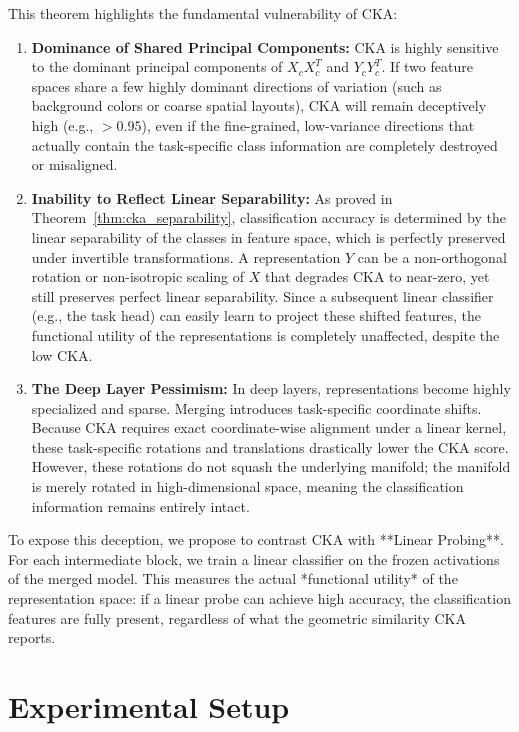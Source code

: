 \documentclass{article}
\theoremstyle{plain}
\theoremstyle{definition}
\theoremstyle{remark}
\begin{document}
This theorem highlights the fundamental vulnerability of CKA:
\begin{enumerate}
  \item \textbf{Dominance of Shared Principal Components:} CKA is highly sensitive to the dominant principal components of $X_c X_c^T$ and $Y_c Y_c^T$. If two feature spaces share a few highly dominant directions of variation (such as background colors or coarse spatial layouts), CKA will remain deceptively high (e.g., $> 0.95$), even if the fine-grained, low-variance directions that actually contain the task-specific class information are completely destroyed or misaligned.
  \item \textbf{Inability to Reflect Linear Separability:} As proved in Theorem~\ref{thm:cka_separability}, classification accuracy is determined by the linear separability of the classes in feature space, which is perfectly preserved under invertible transformations. A representation $Y$ can be a non-orthogonal rotation or non-isotropic scaling of $X$ that degrades CKA to near-zero, yet still preserves perfect linear separability. Since a subsequent linear classifier (e.g., the task head) can easily learn to project these shifted features, the functional utility of the representations is completely unaffected, despite the low CKA.
  \item \textbf{The Deep Layer Pessimism:} In deep layers, representations become highly specialized and sparse. Merging introduces task-specific coordinate shifts. Because CKA requires exact coordinate-wise alignment under a linear kernel, these task-specific rotations and translations drastically lower the CKA score. However, these rotations do not squash the underlying manifold; the manifold is merely rotated in high-dimensional space, meaning the classification information remains entirely intact.
\end{enumerate}

To expose this deception, we propose to contrast CKA with **Linear Probing**. For each intermediate block, we train a linear classifier on the frozen activations of the merged model. This measures the actual *functional utility* of the representation space: if a linear probe can achieve high accuracy, the classification features are fully present, regardless of what the geometric similarity CKA reports.

\vspace{-2mm}
\section{Experimental Setup}
\label{sec:setup}
\end{document}
